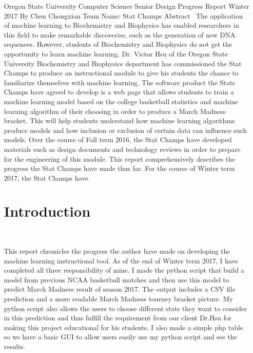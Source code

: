 \documentclass[letterpaper, 10pt,titlepage]{article}
\begin{document}
\begin{center}

Oregon State University Computer Science Senior Design
\bigbreak
Progress Report Winter 2017
\bigbreak
By Chen Chongxian
\bigbreak
Team Name: Stat Champs
\bigbreak
\vspace{3.0cm}
Abstract
\bigbreak
\
The application of machine learning to Biochemistry and Biophysics has enabled researchers in this field to make remarkable discoveries, such as the generation of new DNA sequences. However, students of Biochemistry and Biophysics do not get the opportunity to learn machine learning. Dr. Victor Hsu of the Oregon State University Biochemistry and Biophysics department has commissioned the Stat Champs to produce an instructional module to give his students the chance to familiarize themselves with machine learning. The software product the Stats Champs have agreed to develop is a web page that allows students to train a machine learning model based on the college basketball statistics and machine learning algorithm of their choosing in order to produce a March Madness bracket. This will help students understand how machine learning algorithms produce models and how inclusion or exclusion of certain data can influence such models. Over the course of Fall term 2016, the Stat Champs have developed materials such as design documents and technology reviews in order to prepare for the engineering of this module. This report comprehensively describes the progress the Stat Champs have made thus far. For the course of Winter term 2017, the Stat Champs have 
\newpage
\end{center}

\tableofcontents

\newpage
\section{Introduction}
\
\par This report chronicles the progress the author have made on developing the machine learning instructional tool. As of the end of Winter term 2017, I have completed all three responsibility of mine. I made the python script that build a model from previous NCAA basketball matches and then use this model to predict March Madness result of season 2017. The output includes a CSV file prediction and a more readable March Madness tourney bracket picture. My python script also allows the users to choose different stats they want to consider in this prediction and thus fulfill the requirement from our client Dr.Hsu for making this project educational for his students. I also made a simple php table so we have a basic GUI to allow users easily use my python script and see the results.
\end{document}
